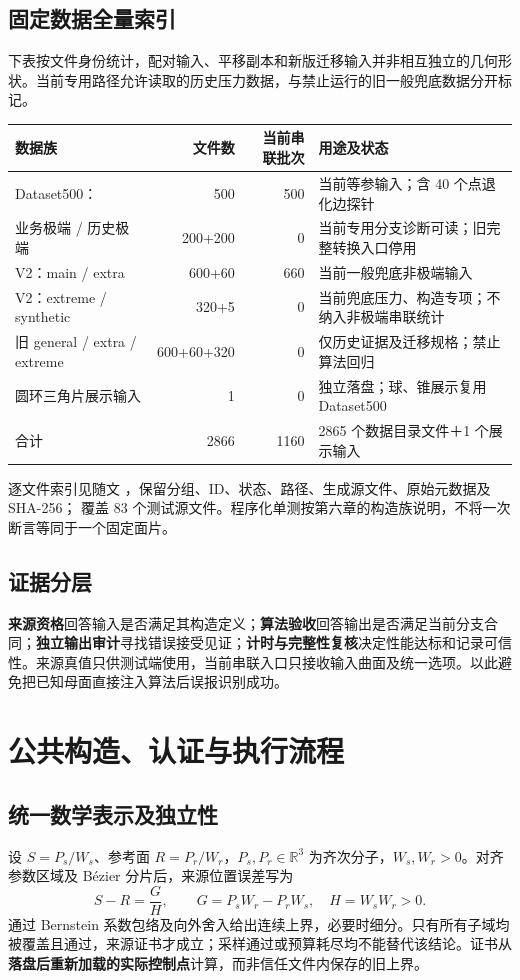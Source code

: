 \documentclass[UTF8,zihao=5,fontset=windows,a4paper]{ctexart}
\begin{document}
\subsection{固定数据全量索引}
下表按文件身份统计，配对输入、平移副本和新版迁移输入并非相互独立的几何形状。当前专用路径允许读取的历史压力数据，与禁止运行的旧一般兜底数据分开标记。
\begin{center}\small\renewcommand{\arraystretch}{1.16}
\begin{tabularx}{\linewidth}{@{}YrrY@{}}\toprule
数据族 & 文件数 & 当前串联批次 & 用途及状态\\\midrule
Dataset500： & 500 & 500 & 当前等参输入；含 40 个点退化边探针\\
业务极端 / 历史极端 & 200+200 & 0 & 当前专用分支诊断可读；旧完整转换入口停用\\
V2：main / extra & 600+60 & 660 & 当前一般兜底非极端输入\\
V2：extreme / synthetic & 320+5 & 0 & 当前兜底压力、构造专项；不纳入非极端串联统计\\
旧 general / extra / extreme & 600+60+320 & 0 & 仅历史证据及迁移规格；禁止算法回归\\
圆环三角片展示输入 & 1 & 0 & 独立落盘；球、锥展示复用 Dataset500\\\midrule
合计 & 2866 & 1160 & 2865 个数据目录文件＋1 个展示输入\\\bottomrule
\end{tabularx}
\end{center}
逐文件索引见随文 ，保留分组、ID、状态、路径、生成源文件、原始元数据及 SHA-256； 覆盖 83 个测试源文件。程序化单测按第六章的构造族说明，不将一次断言等同于一个固定面片。

\subsection{证据分层}
\textbf{来源资格}回答输入是否满足其构造定义；\textbf{算法验收}回答输出是否满足当前分支合同；\textbf{独立输出审计}寻找错误接受见证；\textbf{计时与完整性复核}决定性能达标和记录可信性。来源真值只供测试端使用，当前串联入口只接收输入曲面及统一选项。以此避免把已知母面直接注入算法后误报识别成功。

\newpage
\section{公共构造、认证与执行流程}
\subsection{统一数学表示及独立性}
设 $S=P_s/W_s$、参考面 $R=P_r/W_r$，$P_s,P_r\in\mathbb R^3$ 为齐次分子，$W_s,W_r>0$。对齐参数区域及 Bézier 分片后，来源位置误差写为
\begin{equation}
 S-R=\frac{G}{H},\qquad G=P_sW_r-P_rW_s,\quad H=W_sW_r>0.
\end{equation}
通过 Bernstein 系数包络及向外舍入给出连续上界，必要时细分。只有所有子域均被覆盖且通过，来源证书才成立；采样通过或预算耗尽均不能替代该结论。证书从\textbf{落盘后重新加载的实际控制点}计算，而非信任文件内保存的旧上界。
\end{document}
